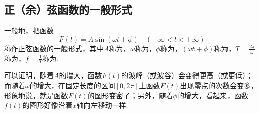 \subsection{正（余）弦函数的一般形式}
\begin{definition}
一般地，把函数\[
F(t) = A \sin(\omega t + \phi) \quad (-\infty<t<+\infty)
\]称作正弦函数的一般形式，其中\(A\)称为，\(\omega\)称为，\(\phi\)称为，\((\omega t + \phi)\)称为，\(T = \frac{2\pi}{\omega}\)称为，\(f = \frac{1}{T}\)称为.
\end{definition}
可以证明，随着\(A\)的增大，函数\(F(t)\)的波峰（或波谷）会变得更高（或更低）；而随着\(\omega\)的增大，在固定长度的区间\([0,2\pi]\)上函数\(F(t)\)出现零点的次数会变多，形象地说，就是函数\(F(t)\)的图形变密了；另外，随着\(\phi\)的增大，看起来，函数\(f(t)\)的图形好像沿着\(x\)轴向左移动一样.
